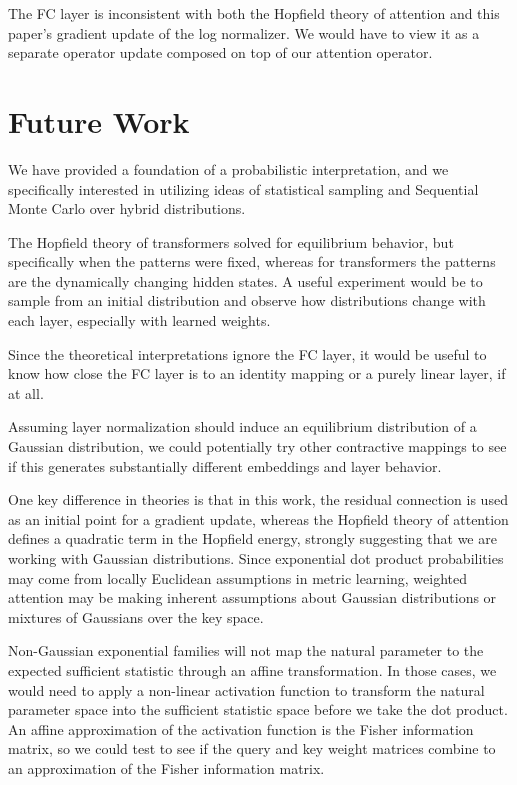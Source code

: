 \documentclass{article}
\begin{document}
The FC layer is inconsistent with both the Hopfield theory of attention and this paper's gradient update of the log normalizer. We would have to view it as a separate operator update composed on top of our attention operator.

\section{Future Work}
\label{future work}
We have provided a foundation of a probabilistic interpretation, and we specifically interested in utilizing ideas of statistical sampling and Sequential Monte Carlo over hybrid distributions. 

The Hopfield theory of transformers solved for equilibrium behavior, but specifically when the patterns were fixed, whereas for transformers the patterns are the dynamically changing hidden states.
A useful experiment would be to sample from an initial distribution and observe how distributions change with each layer, especially with learned weights.

Since the theoretical interpretations ignore the FC layer, it would be useful to know how close the FC layer is to an identity mapping or a purely linear layer, if at all.

Assuming layer normalization should induce an equilibrium distribution of a Gaussian distribution, we could potentially try other contractive mappings to see if this generates substantially different embeddings and layer behavior.

One key difference in theories is that in this work, the residual connection is used as an initial point for a gradient update, whereas the Hopfield theory of attention defines a quadratic term in the Hopfield energy, strongly suggesting that we are working with Gaussian distributions. 
Since exponential dot product probabilities may come from locally Euclidean assumptions in metric learning, weighted attention may be making inherent assumptions about Gaussian distributions or mixtures of Gaussians over the key space.

Non-Gaussian exponential families will not map the natural parameter to the expected sufficient statistic through an affine transformation. In those cases, we would need to apply a non-linear activation function to transform the natural parameter space into the sufficient statistic space before we take the dot product. An affine approximation of the activation function is the Fisher information matrix, so we could test to see if the query and key weight matrices combine to an approximation of the Fisher information matrix.



\end{document}
